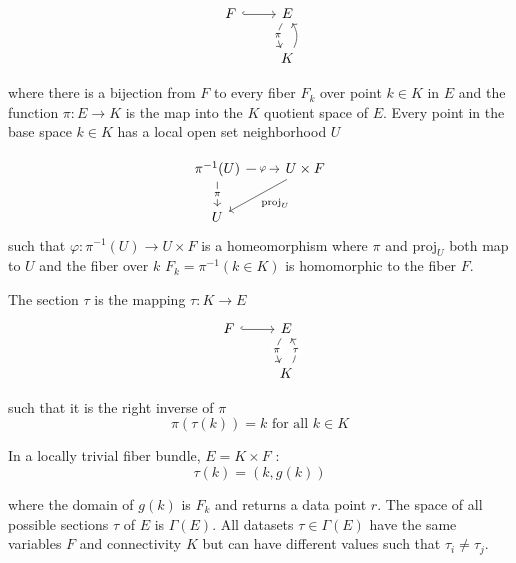 \documentclass[../main.tex]{subfiles}
\begin{document}
\begin{equation}
    \begin{tikzcd}
        F \arrow[r, hook] & E \arrow[d, "\pi" description, bend right ] \\
                        & K \arrow[u, description, bend right]
    \end{tikzcd}
\end{equation}

where there is a bijection from $F$ to every fiber $F_k$ over point $k \in K$ in $E$ and the function $\pi: E \rightarrow K$ is the map into the $K$ quotient space of $E$. Every point in the base space $k \in K$ has a local open set neighborhood $U$ \cite{FiberBundle2020, rowlandFiberBundle}

\begin{equation}
    \begin{tikzcd}
        \pi^{-1}(U) \arrow[r, "\varphi" description] \arrow[d, "\pi" description] & U \times F \arrow[ld, "\mathrm{proj}_U"] \\
        U                                                                         &                                         
    \end{tikzcd}
\end{equation}
such that $\varphi: \pi^{-1}(U) \rightarrow U \times F$ is a homeomorphism where $\pi$ and $\mathrm{proj}_U$ both map to $U$ and the fiber over $k$ $F_k = \pi^{-1}({k \in K}) $ is homomorphic to the fiber $F$.

The section $\tau$ is the mapping $\tau: K\rightarrow E$ 
\begin{equation}
    \begin{tikzcd}
        F \arrow[r, hook] & E \arrow[d, "\pi" description, bend right]    \\
                          & K \arrow[u, "\tau" description, bend right]
        \end{tikzcd}
\end{equation}

such that it is the right inverse of $\pi$
\begin{equation}
    \pi(\tau(k)) = k \text{ for all } k \in K 
\end{equation}

In a locally trivial fiber bundle, $E = K \times F$ \cite{rowlandFiberBundle,FiberBundle2020}:
\begin{equation}
\tau(k) = (k, g(k))
\end{equation}

where the domain of $g(k)$ is $F_k$ and returns a data point $r$. The space of all possible sections $\tau$ of $E$ is $\Gamma(E)$. All datasets $\tau \in \Gamma(E)$ have the same variables $F$ and connectivity $K$ but can have different values such that $\tau_{i}\neq\tau_{j}$.
\end{document}

